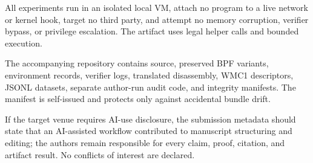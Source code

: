 \documentclass[conference]{IEEEtran}
\begin{document}
All experiments run in an isolated local VM, attach no program to a live network or kernel hook, target no third party, and attempt no memory corruption, verifier bypass, or privilege escalation. The artifact uses legal helper calls and bounded execution.

The accompanying repository contains source, preserved BPF variants, environment records, verifier logs, translated disassembly, WMC1 descriptors, JSONL datasets, separate author-run audit code, and integrity manifests. The manifest is self-issued and protects only against accidental bundle drift.

If the target venue requires AI-use disclosure, the submission metadata should state that an AI-assisted workflow contributed to manuscript structuring and editing; the authors remain responsible for every claim, proof, citation, and artifact result. No conflicts of interest are declared.
\end{document}
